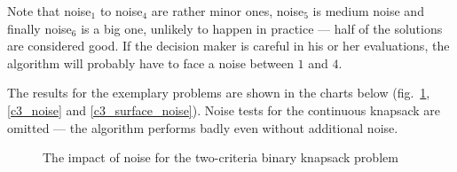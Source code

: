 Note that noise$_1$ to noise$_4$ are rather minor ones, noise$_5$ is medium
noise and finally noise$_6$ is a big one, unlikely to happen in practice ---
half of the solutions are considered good. If the decision maker is careful in
his or her evaluations, the algorithm will probably have to face a noise
between $1$ and $4$.

The results for the exemplary problems are shown in the charts below
(fig.~\ref{c2_noise}, \ref{c3_noise} and \ref{c3_surface_noise}). Noise tests
for the continuous knapsack are omitted --- the algorithm performs badly even
without additional noise.

\begin{figure}
  \centering
  \caption{The impact of noise for the two-criteria binary knapsack problem}
  \label{c2_noise}
\end{figure}

